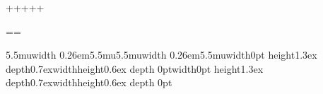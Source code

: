 \hho\hho\circ\circ%
\hhO\hhO{\scriptstyle\bigcirc}{\scriptstyle\bigcirc}%

\lhtimes\rhtimes\uhtimes\dhtimes
\newarrowtail+++++%


\Yright\Yleft\Ydown\Yup

\leftharpoondown\rightharpoondown\upharpoonright
\downharpoonright

\newarrowtail{<=}\Leftarrow{}%




\newarrowfiller{=}=={}{}%
\def\vfthree{\mid\!\!\!\mid\!\!\!\mid}%
\equiv\equiv\vfthree\vfthree


\def\vfdashstrut{\vrule width0pt height1.3ex depth0.7ex}%
\def\vfthedash{\vrule width\intended@breadth height0.6ex depth 0pt}%
\def\hfthedash{\set@axis\vrule\horizhtdp width 0.26em}%
\def\hfdash{\mkern5.5mu\hfthedash\mkern5.5mu}%
\def\vfdash{\vfdashstrut\vfthedash}%
\hfdash\hfdash\vfdash\vfdash



